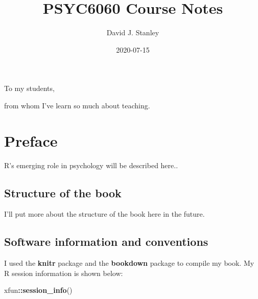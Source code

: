 \documentclass[
]{krantz}
\title{PSYC6060 Course Notes}
\author{David J. Stanley}
\date{2020-07-15}
\makeatletter
\newenvironment{Shaded}{\begin{snugshade}}{\end{snugshade}}
\newcommand{\KeywordTok}[1]{\textcolor[rgb]{0.27,0.27,0.27}{\textbf{#1}}}
\newcommand{\NormalTok}[1]{#1}
\newcommand{\OperatorTok}[1]{\textcolor[rgb]{0.43,0.43,0.43}{\textbf{#1}}}
\newenvironment{kframe}{%
\medskip{}
\setlength{\fboxsep}{.8em}
 \def\at@end@of@kframe{}%
 \ifinner\ifhmode%
  \def\at@end@of@kframe{\end{minipage}}%
  \begin{minipage}{\columnwidth}%
 \fi\fi%
 \def\FrameCommand##1{\hskip\@totalleftmargin \hskip-\fboxsep
 \colorbox{shadecolor}{##1}\hskip-\fboxsep
     \hskip-\linewidth \hskip-\@totalleftmargin \hskip\columnwidth}%
 \MakeFramed {\advance\hsize-\width
   \@totalleftmargin\z@ \linewidth\hsize
   \@setminipage}}%
 {\par\unskip\endMakeFramed%
 \at@end@of@kframe}
\renewenvironment{Shaded}{\begin{kframe}}{\end{kframe}}
\makeatother
\begin{document}
\maketitle


\thispagestyle{empty}

\begin{center}
To my students,

from whom I've learn so much about teaching.
\end{center}

\setlength{\abovedisplayskip}{-5pt}
\setlength{\abovedisplayshortskip}{-5pt}

{
\hypersetup{linkcolor=}
\setcounter{tocdepth}{2}
\tableofcontents
}
\listoftables
\listoffigures
\hypertarget{preface}{%
\chapter*{Preface}\label{preface}}


R's emerging role in psychology will be described here..

\hypertarget{structure-of-the-book}{%
\section*{Structure of the book}\label{structure-of-the-book}}


I'll put more about the structure of the book here in the future.

\hypertarget{software-information-and-conventions}{%
\section*{Software information and conventions}\label{software-information-and-conventions}}


I used the \textbf{knitr} package \citep{xie2015} and the \textbf{bookdown} package \citep{R-bookdown} to compile my book. My R session information is shown below:

\begin{Shaded}
\begin{Highlighting}[]
\NormalTok{xfun}\OperatorTok{::}\KeywordTok{session_info}\NormalTok{()}
\end{Highlighting}
\end{Shaded}
\end{document}
